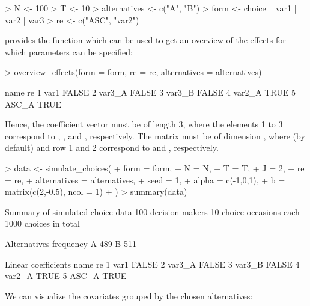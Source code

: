 \documentclass[article]{jss}
\newcommand{\fct}[1]{\code{#1()}}
\begin{document}
\begin{Schunk}
\begin{Sinput}
> N <- 100
> T <- 10
> alternatives <- c("A", "B")
> form <- choice ~ var1 | var2 | var3
> re <- c("ASC", "var2")
\end{Sinput}
\end{Schunk}

 provides the function \fct{overview\_effects} which can be used to get an overview of the effects for which parameters can be specified:

\begin{Schunk}
\begin{Sinput}
> overview_effects(form = form, re = re, alternatives = alternatives)
\end{Sinput}
\begin{Soutput}
    name    re
1   var1 FALSE
2 var3_A FALSE
3 var3_B FALSE
4 var2_A  TRUE
5  ASC_A  TRUE
\end{Soutput}
\end{Schunk}

Hence, the coefficient vector  must be of length 3, where the elements 1 to 3 correspond to , , and , respectively. The matrix  must be of dimension , where (by default)  and row 1 and 2 correspond to  and , respectively.

\begin{Schunk}
\begin{Sinput}
> data <- simulate_choices(
+    form = form,
+    N = N,
+    T = T,
+    J = 2,
+    re = re,
+    alternatives = alternatives,
+    seed = 1,
+    alpha = c(-1,0,1),
+    b = matrix(c(2,-0.5), ncol = 1)
+  )
> summary(data)
\end{Sinput}
\begin{Soutput}
Summary of simulated choice data
100 decision makers 
10 choice occasions each 
1000 choices in total

Alternatives
  frequency
A       489
B       511

Linear coefficients
    name    re
1   var1 FALSE
2 var3_A FALSE
3 var3_B FALSE
4 var2_A  TRUE
5  ASC_A  TRUE
\end{Soutput}
\end{Schunk}

We can visualize the covariates grouped by the chosen alternatives:
\end{document}
